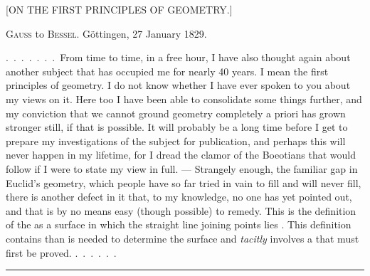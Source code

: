 \clearpage{}
\begin{center}
[ON THE FIRST PRINCIPLES OF GEOMETRY.]
\end{center}

\begin{center}
\textsc{Gauss} to \textsc{Bessel}. Göttingen, 27 January 1829.
\end{center}

.\ .\ .\ .\ .\ .\ .\ From time to time, in a free hour, I have also thought again about another subject that has occupied me for nearly 40 years.
I mean the first principles of geometry. I do not know whether I have ever spoken to you
about my views on it. Here too I have been able to
consolidate some things further, and my conviction that we cannot ground geometry
completely a priori has grown stronger still, if that is possible.
It will probably be a long time before I get to prepare my  investigations of the subject for publication, and perhaps this will never happen in my lifetime,
for I dread the clamor of the Boeotians that would follow if I were to state my view in full. --- Strangely enough,  the familiar gap in
Euclid's geometry, which people have so far tried in vain to fill and will never
fill, there is another defect in it that, to my
knowledge, no one has yet pointed out, and that is by no means easy
(though possible) to remedy. This is the definition of the  as a surface
in which the straight line joining  points lies . This
definition contains  than is needed to determine the surface and \emph{tacitly} involves a  that must first be proved. .\ .\ .\ .\ .\ .

\rule{4cm}{0.5pt}

